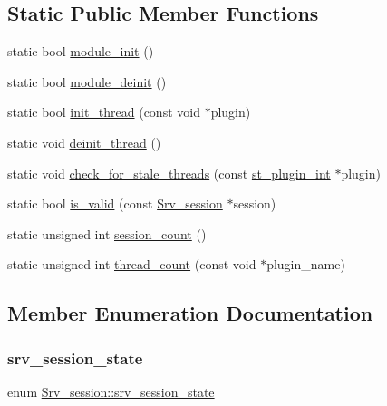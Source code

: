 \subsection*{Static Public Member Functions}
\begin{DoxyCompactItemize}
\item 
static bool \mbox{\hyperlink{classSrv__session_aa0dbb3e216c720bb38d81b172d6118de}{module\+\_\+init}} ()
\item 
static bool \mbox{\hyperlink{classSrv__session_a1c54d3bf9fc6ae6236b8b18b5354b714}{module\+\_\+deinit}} ()
\item 
static bool \mbox{\hyperlink{classSrv__session_a94790b19dd27e8bd99c58ac74ff33280}{init\+\_\+thread}} (const void $\ast$plugin)
\item 
static void \mbox{\hyperlink{classSrv__session_af092a96167d9b06d812a17ee67db3780}{deinit\+\_\+thread}} ()
\item 
static void \mbox{\hyperlink{classSrv__session_a76d8a77081d966de8d6a662a3cefa605}{check\+\_\+for\+\_\+stale\+\_\+threads}} (const \mbox{\hyperlink{structst__plugin__int}{st\+\_\+plugin\+\_\+int}} $\ast$plugin)
\item 
static bool \mbox{\hyperlink{classSrv__session_aae4c0d99ea138cf218f142f322362157}{is\+\_\+valid}} (const \mbox{\hyperlink{classSrv__session}{Srv\+\_\+session}} $\ast$session)
\item 
static unsigned int \mbox{\hyperlink{classSrv__session_acb3905ccf83195292e56b1ae1f4723f2}{session\+\_\+count}} ()
\item 
static unsigned int \mbox{\hyperlink{classSrv__session_a7a2ece559dacfdff32131e36e45eecd1}{thread\+\_\+count}} (const void $\ast$plugin\+\_\+name)
\end{DoxyCompactItemize}


\subsection{Member Enumeration Documentation}
\mbox{\label{classSrv__session_a18b6e470e6fec5df767041054775e0e8}} 
\subsubsection{\texorpdfstring{srv\+\_\+session\+\_\+state}{srv\_session\_state}}
{\footnotesize\ttfamily enum \mbox{\hyperlink{classSrv__session_a18b6e470e6fec5df767041054775e0e8}{Srv\+\_\+session\+::srv\+\_\+session\+\_\+state}}}

